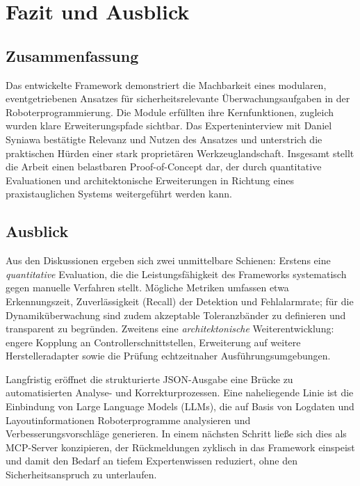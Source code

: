 \chapter{Fazit und Ausblick}
\label{cap:Fazit}

\section{Zusammenfassung}

Das entwickelte Framework demonstriert die Machbarkeit eines modularen,
eventgetriebenen Ansatzes für sicherheitsrelevante Überwachungsaufgaben in der
Roboterprogrammierung. Die Module erfüllten ihre Kernfunktionen, zugleich wurden
klare Erweiterungspfade sichtbar. Das Experteninterview mit Daniel Syniawa
bestätigte Relevanz und Nutzen des Ansatzes und unterstrich die praktischen
Hürden einer stark proprietären Werkzeuglandschaft. Insgesamt stellt die Arbeit
einen belastbaren Proof-of-Concept dar, der durch quantitative Evaluationen und
architektonische Erweiterungen in Richtung eines praxistauglichen Systems
weitergeführt werden kann.

\section{Ausblick}

Aus den Diskussionen ergeben sich zwei unmittelbare Schienen:
Erstens eine \emph{quantitative} Evaluation, die die Leistungsfähigkeit des
Frameworks systematisch gegen manuelle Verfahren stellt. Mögliche Metriken
umfassen etwa Erkennungszeit, Zuverlässigkeit (Recall) der Detektion und
Fehlalarmrate; für die Dynamiküberwachung sind zudem akzeptable Toleranzbänder
zu definieren und transparent zu begründen. Zweitens eine
\emph{architektonische} Weiterentwicklung: engere Kopplung an
Controllerschnittstellen, Erweiterung auf weitere Herstelleradapter sowie die
Prüfung echtzeitnaher Ausführungsumgebungen.

Langfristig eröffnet die strukturierte JSON-Ausgabe eine Brücke zu
automatisierten Analyse- und Korrekturprozessen. Eine naheliegende Linie ist die
Einbindung von Large Language Models (LLMs), die auf Basis von Logdaten und
Layoutinformationen Roboterprogramme analysieren und Verbesserungsvorschläge
generieren. In einem nächsten Schritt ließe sich dies als MCP-Server
konzipieren, der Rückmeldungen zyklisch in das Framework einspeist und damit den
Bedarf an tiefem Expertenwissen reduziert, ohne den Sicherheitsanspruch zu
unterlaufen.
